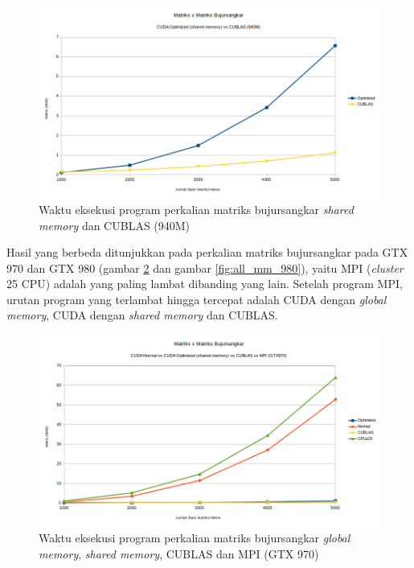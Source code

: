 \begin{figure}
	\centering
	\includegraphics[width=1\textwidth]
	{pics/all_shared_cublas_mm_940}
	\caption{Waktu eksekusi program perkalian matriks bujursangkar \textit{shared memory} dan CUBLAS (940M)}
	\label{fig:all_shared_cublas_mm_940}
\end{figure} 

Hasil yang berbeda ditunjukkan pada perkalian matriks bujursangkar pada GTX 970 dan GTX 980 (gambar \ref{fig:all_mm_970} dan gambar \ref{fig:all_mm_980}), yaitu MPI (\textit{cluster} 25 CPU) adalah yang paling lambat dibanding yang lain. Setelah program MPI, urutan program yang terlambat hingga tercepat adalah CUDA dengan \textit{global memory}, CUDA dengan \textit{shared memory} dan CUBLAS. 

\begin{figure}
	\centering
	\includegraphics[width=1\textwidth]
	{pics/all_mm_970}
	\caption{Waktu eksekusi program perkalian matriks bujursangkar \textit{global memory}, \textit{shared memory}, CUBLAS dan MPI (GTX 970)}
	\label{fig:all_mm_970}
\end{figure} 


